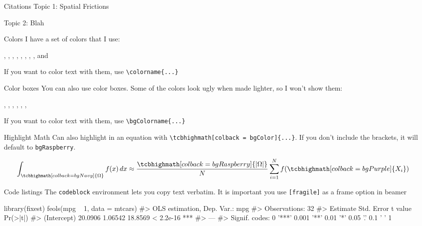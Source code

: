 \documentclass[aspectratio=169,t,11pt,table]{beamer}
\begin{document}
\begin{frame}{Citations}
  Topic 1: Spatial Frictions

  \vspace{5mm}
  Topic 2: Blah 
\end{frame}

\begin{frame}{Colors}
  I have a set of colors that I use:

  ,
  ,
  ,
  ,
  ,
  ,
  ,
  , and 

  \bigskip
  If you want to color text with them, use \texttt{\textbackslash colorname\{...\}}
\end{frame}

\begin{frame}{Color boxes}
  You can also use color boxes. Some of the colors look ugly when made lighter, so I won't show them:

  ,
  ,
  ,
  ,
  ,
  ,

  \bigskip
  If you want to color text with them, use \texttt{\textbackslash bgColorname\{...\}}
\end{frame}

\begin{frame}{Highlight Math}
  Can also highlight in an equation with \texttt{\textbackslash tcbhighmath[colback = bgColor]\{...\}}. If you don't include the brackets, it will default to \texttt{bgRaspberry}.
  
  $$
    \int_{ \tcbhighmath[colback = bgNavy]{\Omega} } f(x) \, dx \approx 
    \frac{\tcbhighmath[colback = bgRaspberry]{ |\Omega| }}{N} 
    \sum_{i=1}^{N} f( \tcbhighmath[colback = bgPurple]{ X_i } )
  $$
\end{frame}

\begin{frame}[fragile]{Code listings}
  The \texttt{codeblock} environment lets you copy text verbatim. It is important you use \texttt{[fragile]} as a frame option in beamer

\begin{codeblock}
library(fixest)
feols(mpg ~ 1, data = mtcars)
#> OLS estimation, Dep. Var.: mpg
#> Observations: 32
#>             Estimate Std. Error t value  Pr(>|t|)    
#> (Intercept)  20.0906    1.06542 18.8569 < 2.2e-16 ***
#> ---
#> Signif. codes:  0 '***' 0.001 '**' 0.01 '*' 0.05 '.' 0.1 ' ' 1
\end{codeblock}
\end{frame}
\end{document}
